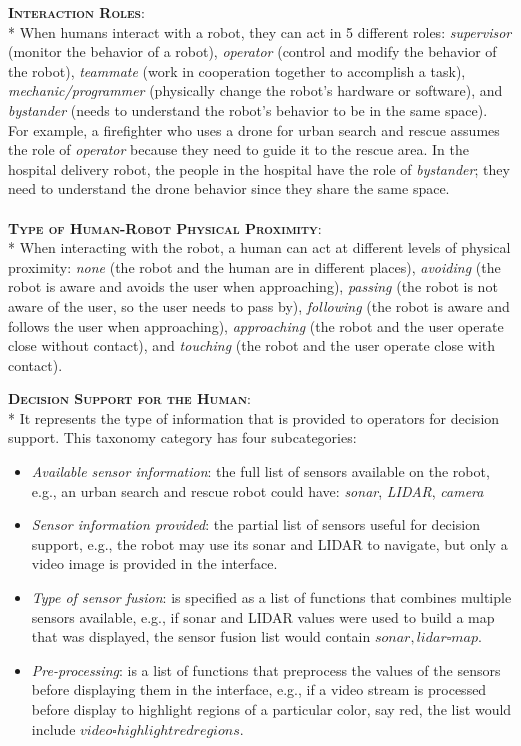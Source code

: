 {\bfseries \scshape Interaction Roles}:\\*
When humans interact with a robot, they can act in 5 different roles: \textit{supervisor} (monitor the behavior of a robot), 
\textit{operator} (control and modify the behavior of the robot), \textit{teammate} (work in cooperation together to accomplish a task), 
\textit{mechanic/programmer} (physically change the robot's hardware or software), and \textit{bystander} 
(needs to understand the robot's behavior to be in the same space).
For example, a firefighter who uses a drone for urban search and rescue assumes the role of \textit{operator} because they need to guide it to the rescue area. 
In the hospital delivery robot, the people in the hospital have the role of \textit{bystander}; they need to understand the drone behavior since they share the same space.
\\\\ %
{\bfseries \scshape Type of Human-Robot Physical Proximity}:\\*
When interacting with the robot, a human can act at different levels of physical proximity: \textit{none} (the robot and the human are in different places), 
\textit{avoiding} (the robot is aware and avoids the user when approaching), \textit{passing} (the robot is not aware of the user, so the user needs to pass by), 
\textit{following} (the robot is aware and follows the user when approaching), 
\textit{approaching} (the robot and the user operate close without contact), and \textit{touching} (the robot and the user operate close with contact).

{\bfseries \scshape Decision Support for the Human}:\\*
It represents the type of information that is provided to operators for decision support. 
This taxonomy category has four subcategories: 
\begin{itemize}
    \item \textit{Available sensor information}: the full list of sensors available on the robot, e.g., an urban search and rescue robot could have: \textit{sonar}, \textit{LIDAR}, \textit{camera}
    \item \textit{Sensor information provided}: the partial list of sensors useful for decision support, e.g., the robot may use its sonar and LIDAR to navigate, but only a video image is provided in the interface.
    \item \textit{Type of sensor fusion}: is specified as a list of functions that combines multiple sensors available, e.g., if sonar and LIDAR values were used to build a map that was displayed, the sensor fusion list would contain \( {{sonar, lidar} \square map } \).
    \item \textit{Pre-processing}: is a list of functions that preprocess the values of the sensors before displaying them in the interface, e.g., if a video stream is processed before display to highlight regions of a particular color, say red, the list would include \( {video \square highlight red regions } \).
\end{itemize}

